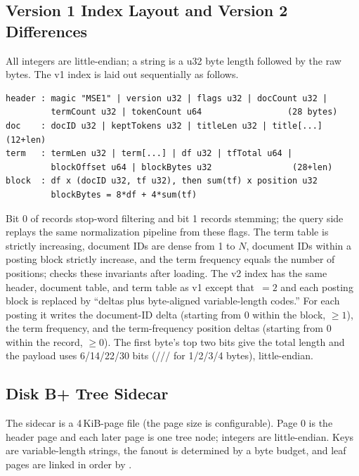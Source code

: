 \subsection{Version 1 Index Layout and Version 2 Differences}

All integers are little-endian; a string is a u32 byte length followed by the
raw bytes. The v1 index is laid out sequentially as follows.

\begin{lstlisting}[style=cli]
header : magic "MSE1" | version u32 | flags u32 | docCount u32 |
         termCount u32 | tokenCount u64                 (28 bytes)
doc    : docID u32 | keptTokens u32 | titleLen u32 | title[...]   (12+len)
term   : termLen u32 | term[...] | df u32 | tfTotal u64 |
         blockOffset u64 | blockBytes u32                (28+len)
block  : df x (docID u32, tf u32), then sum(tf) x position u32
         blockBytes = 8*df + 4*sum(tf)
\end{lstlisting}

Bit 0 of  records stop-word filtering and bit 1 records stemming;
the query side replays the same normalization pipeline from these flags. The
term table is strictly increasing, document IDs are dense from 1 to \(N\),
document IDs within a posting block strictly increase, and the term frequency
equals the number of positions;  checks these invariants
after loading. The v2 index has the same header, document table, and term table
as v1 except that $\,=2$ and each posting block is replaced by
``deltas plus byte-aligned variable-length codes.'' For each posting it writes
the document-ID delta (starting from 0 within the block, $\ge1$), the term
frequency, and the term-frequency position deltas (starting from 0 within the
record, $\ge0$). The first byte's top two bits give the total length and the
payload uses 6/14/22/30 bits (/// for
1/2/3/4 bytes), little-endian.

\subsection{Disk B+ Tree Sidecar}

The sidecar is a 4\,KiB-page file (the page size is configurable). Page 0 is the
header page and each later page is one tree node; integers are little-endian.
Keys are variable-length strings, the fanout is determined by a byte budget, and
leaf pages are linked in order by .

